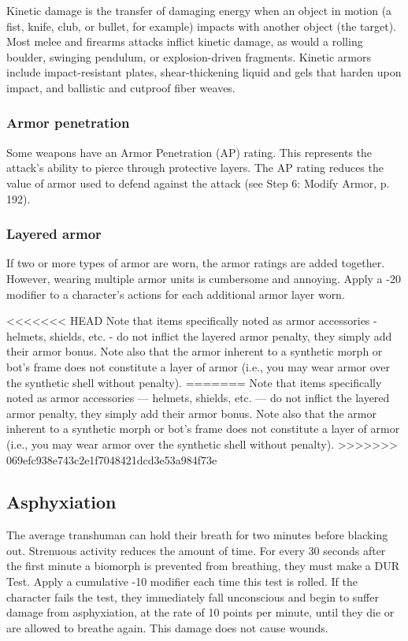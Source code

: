 Kinetic damage is the transfer of damaging energy when an object in motion (a fist, knife, club, or bullet, for example) impacts with another object (the target). Most melee and firearms attacks inflict kinetic damage, as would a rolling boulder, swinging pendulum, or explosion-driven fragments. Kinetic armors include impact-resistant plates, shear-thickening liquid and gels that harden upon impact, and ballistic and cutproof fiber weaves.

\subsubsection{Armor penetration}

Some weapons have an Armor Penetration (AP) rating. This represents the attack’s ability to pierce through protective layers. The AP rating reduces the value of armor used to defend against the attack (see Step 6: Modify Armor, p. 192).

\subsubsection{Layered armor}

If two or more types of armor are worn, the armor ratings are added together. However, wearing multiple armor units is cumbersome and annoying. Apply a -20 modifier to a character’s actions for each additional armor layer worn.

<<<<<<< HEAD
Note that items specifically noted as armor accessories - helmets, shields, etc. - do not inflict the layered armor penalty, they simply add their armor bonus. Note also that the armor inherent to a synthetic morph or bot’s frame does not constitute a layer of armor (i.e., you may wear armor over the synthetic shell without penalty).
=======
Note that items specifically noted as armor accessories --- helmets, shields, etc. --- do not inflict the layered armor penalty, they simply add their armor bonus. Note also that the armor inherent to a synthetic morph or bot’s frame does not constitute a layer of armor (i.e., you may wear armor over the synthetic shell without penalty).
>>>>>>> 069efc938e743c2e1f7048421dcd3e53a984f73e


\subsection{Asphyxiation}
\label{sec:asphyxiation}

The average transhuman can hold their breath for two minutes before blacking out. Strenuous activity reduces the amount of time. For every 30 seconds after the first minute a biomorph is prevented from breathing, they must make a DUR Test. Apply a cumulative -10 modifier each time this test is rolled. If the character fails the test, they immediately fall unconscious and begin to suffer damage from asphyxiation, at the rate of 10 points per minute, until they die or are allowed to breathe again. This damage does not cause wounds.

